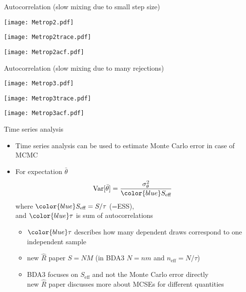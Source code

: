\documentclass[finnish,english,t]{beamer}
\def\eff{\text{eff}}
\DeclareMathOperator{\Var}{Var}
\begin{document}
\begin{frame}{Autocorrelation {\large (slow mixing due to small step size)}}

  \vspace{-1.2\baselineskip}
  \hspace{-5mm}\begin{minipage}[t][][b]{4.5cm}
  \texttt{[image: Metrop2.pdf]}
  \end{minipage}
  \begin{minipage}[t][][b]{5cm}
    \texttt{[image: Metrop2trace.pdf]}
  \end{minipage}
  \vspace{-\baselineskip}
  \texttt{[image: Metrop2acf.pdf]}
  
\end{frame}

\begin{frame}{Autocorrelation {\large (slow mixing due to many rejections)}}

  \vspace{-1.2\baselineskip}
  \hspace{-5mm}\begin{minipage}[t][][b]{4.5cm}
    \texttt{[image: Metrop3.pdf]}
  \end{minipage}
  \begin{minipage}[t][][b]{5cm}
    \texttt{[image: Metrop3trace.pdf]}
  \end{minipage}
  \vspace{-\baselineskip}
  \texttt{[image: Metrop3acf.pdf]}
  
\end{frame}

\begin{frame}{Time series analysis}

  \begin{itemize}
  \item Time series analysis can be used to estimate Monte Carlo
    error in case of MCMC
  \item For expectation $\bar{\theta}$
    \begin{equation*}
      \Var[\bar{\theta}] = \frac{\sigma^2_\theta}{\color{blue}S_\eff}
    \end{equation*}
    where ${\color{blue}S_\eff=S/\tau}$ (=ESS),\\ and ${\color{blue}\tau}$ is sum of autocorrelations
    \begin{itemize}
      \item<2-> ${\color{blue}\tau}$ describes how many dependent draws correspond to one independent sample
      \item<3-> new $\widehat{R}$ paper $S=NM$ (in BDA3 $N=nm$ and $n_\eff=N/\tau$)
      \item<4-> BDA3 focuses on $S_\eff$ and not the Monte Carlo error directly\\
        new $\widehat{R}$ paper discusses more about MCSEs for different quantities
    \end{itemize}
  \end{itemize}  
\end{frame}
\end{document}
